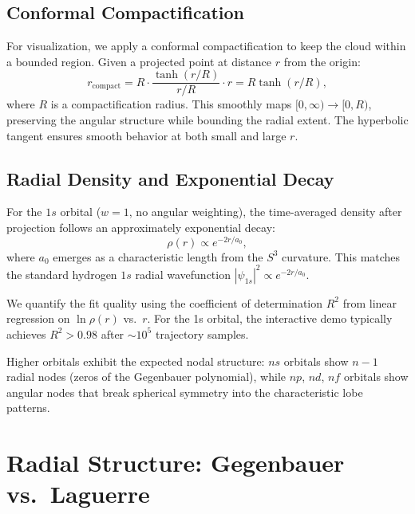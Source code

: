 \documentclass[12pt, a4paper]{article}
\theoremstyle{definition}
\theoremstyle{remark}
\newcommand{\Sthree}{S^3}
\begin{document}
\subsection{Conformal Compactification}

For visualization, we apply a conformal compactification to keep the cloud
within a bounded region. Given a projected point at distance $r$ from the
origin:
\begin{equation}
  r_{\text{compact}} = R \cdot \frac{\tanh(r/R)}{r/R} \cdot r
  = R \tanh(r/R),
  \label{eq:compact}
\end{equation}
where $R$ is a compactification radius. This smoothly maps
$[0, \infty) \to [0, R)$, preserving the angular structure while bounding
the radial extent. The hyperbolic tangent ensures smooth behavior at both
small and large $r$.

\subsection{Radial Density and Exponential Decay}

For the $1s$ orbital ($w = 1$, no angular weighting), the time-averaged
density after projection follows an approximately exponential decay:
\begin{equation}
  \rho(r) \propto e^{-2r/a_0},
  \label{eq:radial}
\end{equation}
where $a_0$ emerges as a characteristic length from the $\Sthree$ curvature.
This matches the standard hydrogen $1s$ radial wavefunction
$|\psi_{1s}|^2 \propto e^{-2r/a_0}$.

We quantify the fit quality using the coefficient of determination $R^2$
from linear regression on $\ln\rho(r)$ vs.\ $r$. For the 1s orbital, the
interactive demo typically achieves $R^2 > 0.98$ after $\sim 10^5$
trajectory samples.

Higher orbitals exhibit the expected nodal structure: $ns$ orbitals show
$n-1$ radial nodes (zeros of the Gegenbauer polynomial), while $np$, $nd$,
$nf$ orbitals show angular nodes that break spherical symmetry into the
characteristic lobe patterns.


\section{Radial Structure: Gegenbauer vs.\ Laguerre}
\label{sec:radial}
\end{document}

